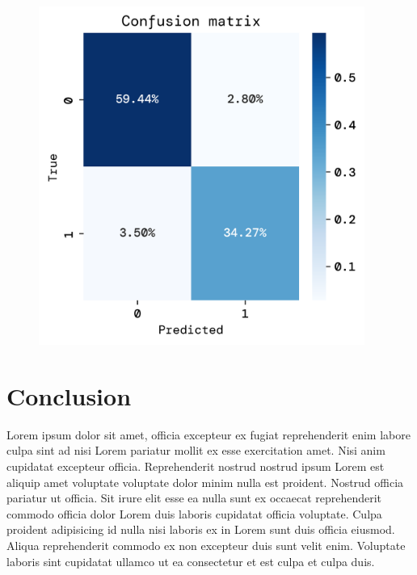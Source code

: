 \documentclass[twoside,11pt]{report}
\begin{document}
    \begin{figure}
        \begin{center}
            \includegraphics[width=0.95\textwidth]{../runsAndFigures/confusion_matrix.png}
        \end{center}
        \caption{}\label{fig:}
    \end{figure}



\section{Conclusion}
\label{sec:conclusion}


    Lorem ipsum dolor sit amet, officia excepteur ex fugiat reprehenderit enim labore culpa sint ad nisi Lorem pariatur mollit ex esse exercitation amet. Nisi anim cupidatat excepteur officia. Reprehenderit nostrud nostrud ipsum Lorem est aliquip amet voluptate voluptate dolor minim nulla est proident. Nostrud officia pariatur ut officia. Sit irure elit esse ea nulla sunt ex occaecat reprehenderit commodo officia dolor Lorem duis laboris cupidatat officia voluptate. Culpa proident adipisicing id nulla nisi laboris ex in Lorem sunt duis officia eiusmod. Aliqua reprehenderit commodo ex non excepteur duis sunt velit enim. Voluptate laboris sint cupidatat ullamco ut ea consectetur et est culpa et culpa duis.
\end{document}
